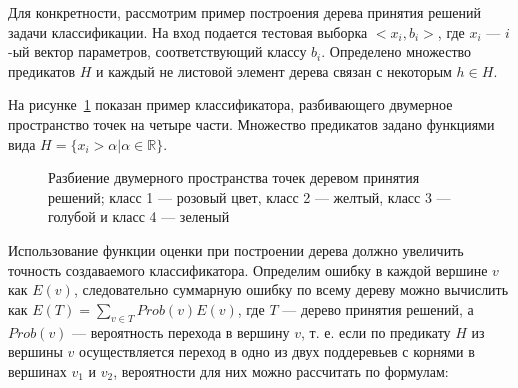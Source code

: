 \documentclass[a4paper,14pt]{extarticle} %
\begin{document}
Для конкретности, рассмотрим пример построения дерева принятия решений задачи классификации. На вход подается тестовая выборка $<x_i,b_i>$, где $x_i$ --- $i$-ый вектор параметров, соответствующий классу $b_i$. Определено множество предикатов $H$ и каждый не листовой элемент дерева связан с некоторым $h \in H$. 

На рисунке~\ref{fig:range-split} показан пример классификатора, разбивающего двумерное пространство точек на четыре части. Множество предикатов задано функциями вида $H=\{x_i > \alpha | \alpha \in \mathbb{R}\}$.

\begin{figure}[h]
\begin{minipage}[h]{0.49\linewidth}
\end{minipage}
\hfill
\begin{minipage}[h]{0.49\linewidth}
\end{minipage}
\caption{Разбиение двумерного пространства точек деревом принятия решений; класс 1 --- розовый цвет, класс 2 --- желтый, класс 3 --- голубой и класс 4 --- зеленый}
\label{fig:range-split}
\end{figure}

Использование функции оценки при построении дерева должно увеличить точность создаваемого классификатора. Определим ошибку в каждой вершине $v$ как $E(v)$, следовательно суммарную ошибку по всему дереву можно вычислить как $E(T) = \sum\limits_{v \in T} Prob(v)E(v)$, где $T$ --- дерево принятия решений, а $Prob(v)$ --- вероятность перехода в вершину $v$, т. е. если по предикату $H$ из вершины $v$ осуществляется переход в одно из двух поддеревьев с корнями в вершинах $v_1$ и $v_2$, вероятности для них можно рассчитать по формулам:
\end{document}

